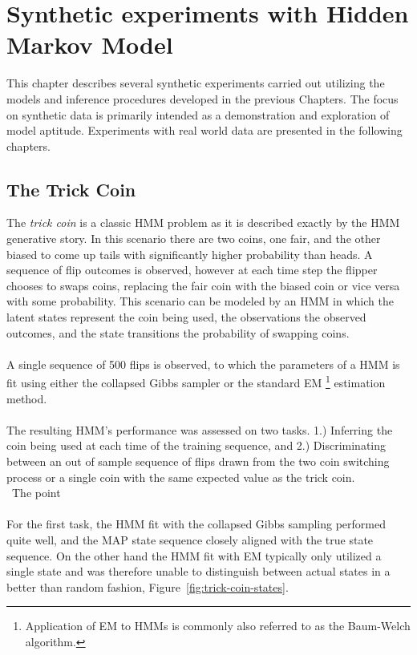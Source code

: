 \documentclass[12pt]{report}
\newcommand{\1}[0]{\mathbbm{1}}
\begin{document}
\chapter{Synthetic experiments with Hidden Markov Model}
This chapter describes several synthetic experiments carried out utilizing the models and
inference procedures developed in the previous Chapters. The focus on synthetic data
is primarily intended as a demonstration and exploration of model aptitude. Experiments
with real world data are presented in the following chapters.

\section{The Trick Coin}
The \emph{trick coin} is a classic \ac{HMM} problem as it is described exactly
by the \ac{HMM} generative story. In this scenario there are two coins, one fair,
and the other biased to come up tails with significantly higher probability than heads.
A sequence of flip outcomes is observed, however at each time step the flipper chooses
to swaps coins, replacing the fair coin with the biased coin or vice versa with some probability.
This scenario can be modeled by an \ac{HMM} in which the latent
states represent the coin being used, the observations the observed outcomes, and
the state transitions the probability of swapping coins.
\\\\
A single sequence of 500 flips is observed, to which the parameters of a \ac{HMM} is fit using
either the collapsed Gibbs sampler or the standard \ac{EM}
\footnote{Application of \ac{EM} to \acp{HMM} is commonly also referred to as
the Baum-Welch algorithm.}
estimation method.
\\\\
The resulting \ac{HMM}'s performance was assessed on two tasks. 1.) Inferring
the coin being used at each time of the training sequence, and 2.) Discriminating between an
out of sample sequence of flips drawn from the two coin switching process or a single coin with the
same expected value as the trick coin.
\\\
The point
\\\\
For the first task, the \ac{HMM} fit with the collapsed Gibbs sampling performed quite well,
and the \ac{MAP} state sequence closely aligned with the true state sequence.
On the other hand the \ac{HMM} fit with \ac{EM} typically only utilized a single state
and was therefore unable to distinguish between actual states in a better than random fashion,
Figure~\ref{fig:trick-coin-states}.
\end{document}
